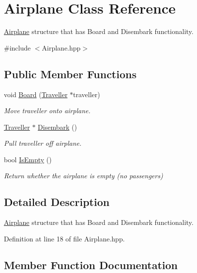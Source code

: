 \hypertarget{classAirplane}{}\section{Airplane Class Reference}
\label{classAirplane}


\hyperlink{classAirplane}{Airplane} structure that has Board and Disembark functionality.  




{\ttfamily \#include $<$Airplane.\+hpp$>$}

\subsection*{Public Member Functions}
\begin{DoxyCompactItemize}
\item 
void \hyperlink{classAirplane_af6f7e57abec0bf44446678b205b4b95e}{Board} (\hyperlink{structTraveller}{Traveller} $\ast$traveller)
\begin{DoxyCompactList}\small\item\em Move traveller onto airplane. \end{DoxyCompactList}\item 
\hyperlink{structTraveller}{Traveller} $\ast$ \hyperlink{classAirplane_a2639398261ef756a620a7c6e5136ec99}{Disembark} ()
\begin{DoxyCompactList}\small\item\em Pull traveller off airplane. \end{DoxyCompactList}\item 
bool \hyperlink{classAirplane_a709f58346c490b7895c32f7103912237}{Is\+Empty} ()
\begin{DoxyCompactList}\small\item\em Return whether the airplane is empty (no passengers) \end{DoxyCompactList}\end{DoxyCompactItemize}


\subsection{Detailed Description}
\hyperlink{classAirplane}{Airplane} structure that has Board and Disembark functionality. 

Definition at line 18 of file Airplane.\+hpp.



\subsection{Member Function Documentation}
